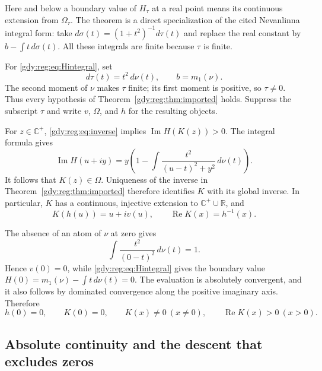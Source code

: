 \documentclass[11pt]{article}
\numberwithin{equation}{section}
\theoremstyle{definition}
\theoremstyle{remark}
\DeclareMathOperator{\Rea}{Re}
\DeclareMathOperator{\Ima}{Im}
\begin{document}
Here and below a boundary value of $H_\tau$ at a real point means its
continuous extension from $\Omega_\tau$.  The theorem is a direct
specialization of the cited Nevanlinna integral form: take
$d\sigma(t)=(1+t^2)^{-1}d\tau(t)$ and replace the real constant by
$b-\int t\,d\sigma(t)$.  All these integrals are finite because $\tau$
is finite.

For \eqref{gdy:reg:eq:Hintegral}, set
\begin{equation}\label{gdy:reg:eq:tau}
 d\tau(t)=t^2\,d\nu(t),\qquad b=m_1(\nu).
\end{equation}
The second moment of $\nu$ makes $\tau$ finite; its first moment is
positive, so $\tau\ne0$.  Thus every hypothesis of
Theorem~\ref{gdy:reg:thm:imported} holds.  Suppress the subscript $\tau$ and
write $v$, $\Omega$, and $h$ for the resulting objects.

For $z\in\mathbb C^+$, \eqref{gdy:reg:eq:inverse} implies
$\Ima H(K(z))>0$.  The integral formula gives
\begin{equation}\label{gdy:reg:eq:imagH}
 \Ima H(u+iy)
 =y\left(1-\int\frac{t^2}{(u-t)^2+y^2}\,d\nu(t)\right).
\end{equation}
It follows that $K(z)\in\Omega$.  Uniqueness of the inverse in
Theorem~\ref{gdy:reg:thm:imported} therefore identifies $K$ with its global
inverse.  In particular, $K$ has a continuous, injective extension to
$\mathbb C^+\cup\mathbb R$, and
\begin{equation}\label{gdy:reg:eq:boundaryinverse}
 K(h(u))=u+iv(u),\qquad \Rea K(x)=h^{-1}(x).
\end{equation}

The absence of an atom of $\nu$ at zero gives
\[
 \int\frac{t^2}{(0-t)^2}\,d\nu(t)=1.
\]
Hence $v(0)=0$, while \eqref{gdy:reg:eq:Hintegral} gives the boundary value
$H(0)=m_1(\nu)-\int t\,d\nu(t)=0$.  The evaluation is absolutely
convergent, and it also follows by dominated convergence along the
positive imaginary axis.  Therefore
\begin{equation}\label{gdy:reg:eq:Ksign}
 h(0)=0,\qquad K(0)=0,\qquad
 K(x)\ne0\ (x\ne0),\qquad
 \Rea K(x)>0\ (x>0).
\end{equation}

\subsection{Absolute continuity and the descent that excludes zeros}
\label{gdy:reg:subsec:descent}
\end{document}
